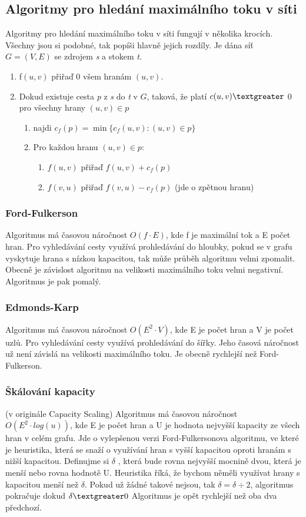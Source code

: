 \documentclass[12pt,a4paper]{article}
\begin{document}
	 \subsection{Algoritmy pro hledání maximálního toku v síti}
	 Algoritmy pro hledání maximálního toku v síti fungují v několika krocích. Všechny jsou si podobné, tak popíši hlavně jejich rozdíly. Je dána síť $G=(V,E)$ se zdrojem \textit{s} a stokem \textit{t}.
	 \begin{enumerate}
	 \item f$(u,v)$ přiřaď 0 všem hranám $(u,v)$.
	 \item Dokud existuje cesta \textit{p} z \textit{s} do \textit{t} v $G$, taková, že platí $c(u,v)\textgreater$  0 pro všechny hrany $(u,v)\in p$
	 \begin{enumerate}
	 \item najdi $c_f(p)=\min\{c_f(u,v):(u,v)\in p\}$
	 \item Pro každou hranu $(u,v)\in p$:
	 \begin{enumerate}
	 \item $f(u,v)$ přiřaď $f(u,v)+c_{f}(p)$ 
	 \item $f(v,u)$ přiřaď $f(v,u)-c_{f}(p)$ (jde o zpětnou hranu)
	 \end{enumerate}
	 \end{enumerate}
	 \end{enumerate}
	 \subsubsection{Ford-Fulkerson}
	 Algoritmus má časovou náročnost $O(f\cdot E)$, kde f je maximální tok a E počet hran. Pro vyhledávání cesty využívá prohledávání do hloubky, pokud se v grafu vyskytuje hrana s nízkou kapacitou, tak může průběh algoritmu velmi zpomalit. Obecně je závislost algoritmu na velikosti maximálního toku velmi negativní. Algoritmus je pak pomalý.
	 \subsubsection{Edmonds-Karp}
	 Algoritmus má časovou náročnost $O(E^2\cdot V)$, kde E je počet hran a V je počet uzlů. Pro vyhledávání cesty využívá prohledávání do šířky. Jeho časová náročnost už není závislá na velikosti maximálního toku. Je obecně rychlejší než Ford-Fulkerson.
	 \subsubsection{Škálování kapacity}
	 (v originále Capacity Scaling) 
	 Algoritmus má časovou náročnost $O(E^2\cdot log(u))$, kde E je počet hran a U je hodnota nejvyšší kapacity ze všech hran v celém grafu. Jde o vylepšenou verzi Ford-Fulkersonova algoritmu, ve které je heuristika, která se snaží o využívání hran s vyšší kapacitou oproti hranám s nižší kapacitou. Definujme si $\delta$
	 , která bude rovna nejvyšší mocnině dvou, která je menší nebo rovna hodnotě U. Heuristika říká, že bychom něměli využívat hrany s kapacitou menší než $\delta$. Pokud už žádné takové nejsou, tak $\delta = \delta \div 2$, algoritmus pokračuje dokud $\delta \textgreater  0$ Algoritmus je opět rychlejší než oba dva předchozí.
	 \newpage
\end{document}
